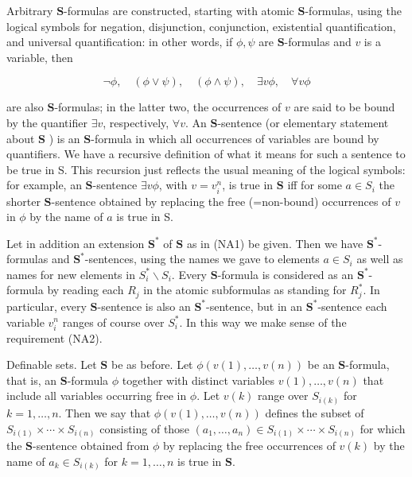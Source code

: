 \documentclass[10pt]{article}
\begin{document}
Arbitrary $\mathbf{S}$-formulas are constructed, starting with atomic $\mathbf{S}$-formulas, using the logical symbols for negation, disjunction, conjunction, existential quantification, and universal quantification: in other words, if $\phi, \psi$ are $\mathbf{S}$-formulas and $v$ is a variable, then

$$
\neg \phi, \quad(\phi \vee \psi), \quad(\phi \wedge \psi), \quad \exists v \phi, \quad \forall v \phi
$$

are also $\mathbf{S}$-formulas; in the latter two, the occurrences of $v$ are said to be bound by the quantifier $\exists v$, respectively, $\forall v$. An $\mathbf{S}$-sentence (or elementary statement about $\mathbf{S}$ ) is an $\mathbf{S}$-formula in which all occurrences of variables are bound by quantifiers. We have a recursive definition of what it means for such a sentence to be true in S. This recursion just reflects the usual meaning of the logical symbols: for example, an $\mathbf{S}$-sentence $\exists v \phi$, with $v=v_{i}^{n}$, is true in $\mathbf{S}$ iff for some $a \in S_{i}$ the shorter $\mathbf{S}$-sentence obtained by replacing the free (=non-bound) occurrences of $v$ in $\phi$ by the name of $a$ is true in S.

Let in addition an extension $\mathbf{S}^{*}$ of $\mathbf{S}$ as in (NA1) be given. Then we have $\mathbf{S}^{*}$-formulas and $\mathbf{S}^{*}$-sentences, using the names we gave to elements $a \in S_{i}$ as well as names for new elements in $S_{i}^{*} \backslash S_{i}$. Every $\mathbf{S}$-formula is considered as an $\mathbf{S}^{*}$-formula by reading each $R_{j}$ in the atomic subformulas as standing for $R_{j}^{*}$. In particular, every $\mathbf{S}$-sentence is also an $\mathbf{S}^{*}$-sentence, but in an $\mathbf{S}^{*}$-sentence each variable $v_{i}^{n}$ ranges of course over $S_{i}^{*}$. In this way we make sense of the requirement (NA2).

Definable sets. Let $\mathbf{S}$ be as before. Let $\phi(v(1), \ldots, v(n))$ be an $\mathbf{S}$-formula, that is, an $\mathbf{S}$-formula $\phi$ together with distinct variables $v(1), \ldots, v(n)$ that include all variables occurring free in $\phi$. Let $v(k)$ range over $S_{i(k)}$ for $k=1, \ldots, n$. Then we say that $\phi(v(1), \ldots, v(n))$ defines the subset of $S_{i(1)} \times \cdots \times S_{i(n)}$ consisting of those $\left(a_{1}, \ldots, a_{n}\right) \in S_{i(1)} \times \cdots \times S_{i(n)}$ for which the $\mathbf{S}$-sentence obtained from $\phi$ by replacing the free occurrences of $v(k)$ by the name of $a_{k} \in S_{i(k)}$ for $k=1, \ldots, n$ is true in $\mathbf{S}$.
\end{document}

